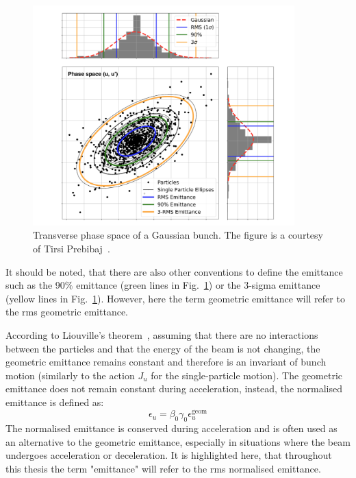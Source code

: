 \begin{figure}[!h] 
    \centering         
    \includegraphics[width=0.9\textwidth]{images/Ch2/transverse_phase_space_emittance.png}
        \caption{Transverse phase space of a Gaussian bunch. The figure is a courtesy of Tirsi Prebibaj~\cite{tirsi_thesis_presentation}.}
        \label{fig:phase_space_emittance}
 \end{figure}

It should be noted, that there are also other conventions to define the emittance such as the 90$\%$ emittance (green lines in Fig.~\ref{fig:phase_space_emittance}) or the 3-sigma emittance (yellow lines in Fig.~\ref{fig:phase_space_emittance}). However, here the term geometric emittance will refer to the rms geometric emittance.

According to Liouville’s theorem~\cite{wolski2014}, assuming that there are no interactions between the particles and that the energy of the beam is not changing, the geometric emittance remains constant and therefore is an invariant of bunch motion (similarly to the action $J_u$ for the single-particle motion). The geometric emittance does not remain constant during acceleration, instead, the normalised emittance is defined as:
\begin{equation}\label{eq:normalised_emittance}
    \epsilon_u = \beta_0 \gamma_0 \epsilon^{\mathrm{geom}}_u
\end{equation}
The normalised emittance is conserved during acceleration and is often used as an alternative to the geometric emittance, especially in situations where the beam undergoes acceleration or deceleration. It is highlighted here, that throughout this thesis the term "emittance" will refer to the rms normalised emittance.

